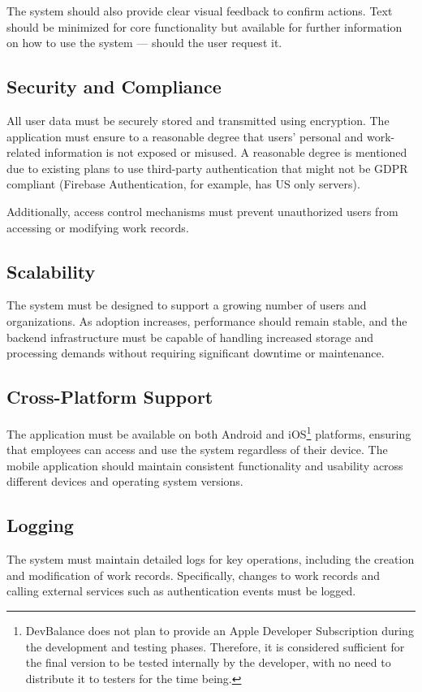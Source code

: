 \documentclass[
  digital,     %
  oneside,     %
  nosansbold,  %
  nocolorbold, %
  lof,         %
  lot,         %
]{fithesis4}
\begin{document}
The system should also provide clear visual feedback to confirm actions. Text should be minimized for core functionality but available for further information on how to use the system --- should the user request it.

\subsection{Security and Compliance}  
All user data must be securely stored and transmitted using encryption. The application must ensure to a reasonable degree that users' personal and work-related information is not exposed or misused. A reasonable degree is mentioned due to existing plans to use third-party authentication that might not be \gls{GDPR} compliant (Firebase Authentication, for example, has US only servers).

Additionally, access control mechanisms must prevent unauthorized users from accessing or modifying work records.

\subsection{Scalability}  
The system must be designed to support a growing number of users and organizations. As adoption increases, performance should remain stable, and the backend infrastructure must be capable of handling increased storage and processing demands without requiring significant downtime or maintenance.

\subsection{Cross-Platform Support}  
The application must be available on both Android and \gls{iOS}\footnote{DevBalance does not plan to provide an Apple Developer Subscription during the development and testing phases. Therefore, it is considered sufficient for the final version to be tested internally by the developer, with no need to distribute it to testers for the time being.} platforms, ensuring that employees can access and use the system regardless of their device. The mobile application should maintain consistent functionality and usability across different devices and operating system versions.

\subsection{Logging}  
The system must maintain detailed logs for key operations, including the creation and modification of work records. Specifically, changes to work records and calling external services such as authentication events must be logged.
\end{document}

